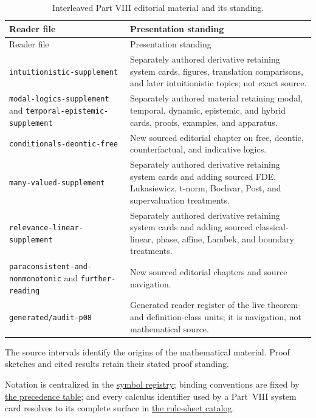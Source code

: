 \begin{longtable}{@{}p{}p{}@{}}
\caption{Interleaved Part VIII editorial material and its standing.}
\label{tab:p08-editorial-route}\\
\toprule
Reader file & Presentation standing \\
\midrule
\endfirsthead
\toprule
Reader file & Presentation standing \\
\midrule
\endhead
\texttt{intuitionistic-supplement} &
Separately authored derivative retaining system cards, figures, translation
comparisons, and later intuitionistic topics; not exact source. \\
\texttt{modal-logics-supplement} and
\texttt{temporal-epistemic-supplement} &
Separately authored material retaining modal, temporal, dynamic, epistemic,
and hybrid cards, proofs, examples, and apparatus. \\
\texttt{conditionals-deontic-free} &
New sourced editorial chapter on free, deontic, counterfactual, and indicative
logics. \\
\texttt{many-valued-supplement} &
Separately authored derivative retaining system cards and adding sourced FDE,
Lukasiewicz, t-norm, Bochvar, Post, and supervaluation treatments. \\
\texttt{relevance-linear-supplement} &
Separately authored derivative retaining system cards and adding sourced
classical-linear, phase, affine, Lambek, and boundary treatments. \\
\texttt{paraconsistent-and-nonmonotonic} and \texttt{further-reading} &
New sourced editorial chapters and source navigation. \\
\texttt{generated/audit-p08} &
Generated reader register of the live theorem- and definition-class units; it
is navigation, not mathematical source. \\
\bottomrule
\end{longtable}

The source intervals identify the origins of the mathematical material.
Proof sketches and cited results retain their stated proof standing.

Notation is centralized in the
\hyperref[sec:p01-symbol-registry]{symbol registry}; binding conventions are
fixed by \hyperref[tab:p01-precedence]{the precedence table}; and every
calculus identifier used by a Part~VIII system card resolves to its complete
surface in \hyperref[sec:p14-rule-sheets]{the rule-sheet catalog}.
